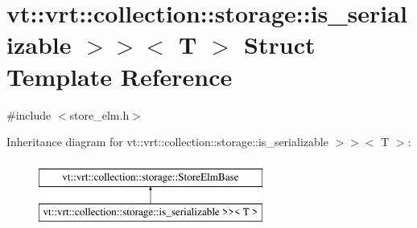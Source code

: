 \hypertarget{structvt_1_1vrt_1_1collection_1_1storage_1_1_store_elm_3_01_t_00_01typename_01std_1_1enable__if_947e0655769addb625fb511f777768bd}{}\section{vt\+:\+:vrt\+:\+:collection\+:\+:storage\+:\+:is\+\_\+serializable $>$$>$$<$ T $>$ Struct Template Reference}
\label{structvt_1_1vrt_1_1collection_1_1storage_1_1_store_elm_3_01_t_00_01typename_01std_1_1enable__if_947e0655769addb625fb511f777768bd}


{\ttfamily \#include $<$store\+\_\+elm.\+h$>$}

Inheritance diagram for vt\+:\+:vrt\+:\+:collection\+:\+:storage\+:\+:is\+\_\+serializable $>$$>$$<$ T $>$\+:\begin{figure}[H]
\begin{center}
\leavevmode
\includegraphics[height=2.000000cm]{structvt_1_1vrt_1_1collection_1_1storage_1_1_store_elm_3_01_t_00_01typename_01std_1_1enable__if_947e0655769addb625fb511f777768bd}
\end{center}
\end{figure}
